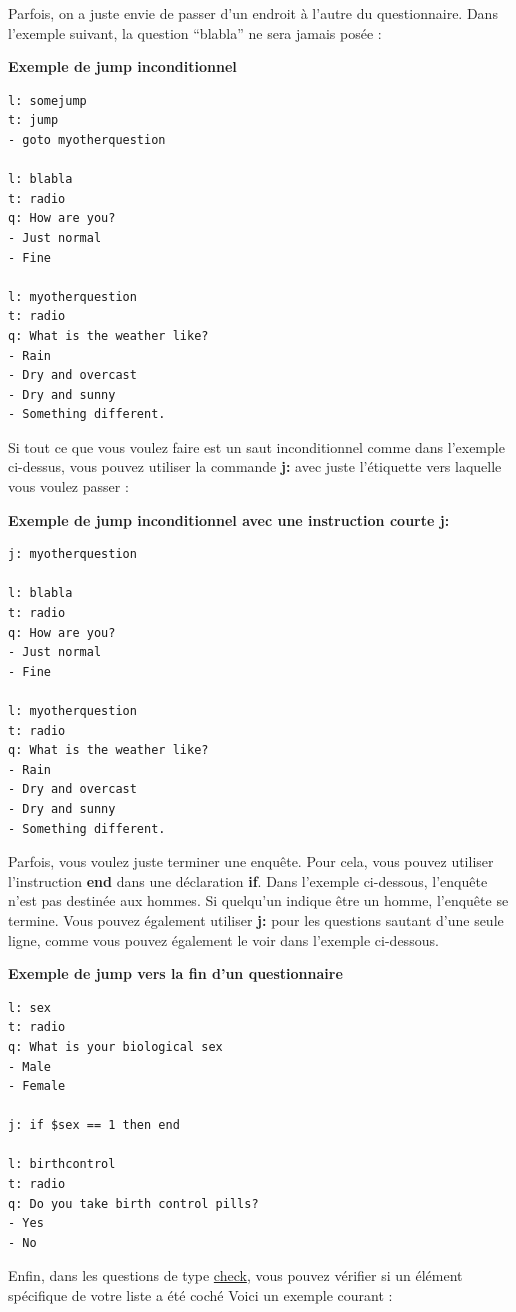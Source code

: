 \documentclass[
]{book}
\begin{document}
Parfois, on a juste envie de passer d'un endroit à l'autre du
questionnaire. Dans l'exemple suivant, la question ``blabla'' ne sera
jamais posée :

\textbf{Exemple de jump inconditionnel}

\begin{verbatim}
l: somejump
t: jump
- goto myotherquestion

l: blabla
t: radio
q: How are you?
- Just normal
- Fine

l: myotherquestion
t: radio
q: What is the weather like?
- Rain
- Dry and overcast
- Dry and sunny
- Something different.
\end{verbatim}

Si tout ce que vous voulez faire est un saut inconditionnel comme dans
l'exemple ci-dessus, vous pouvez utiliser la commande \textbf{j:} avec
juste l'étiquette vers laquelle vous voulez passer :

\textbf{Exemple de jump inconditionnel avec une instruction courte j:}

\begin{verbatim}
j: myotherquestion

l: blabla
t: radio
q: How are you?
- Just normal
- Fine

l: myotherquestion
t: radio
q: What is the weather like?
- Rain
- Dry and overcast
- Dry and sunny
- Something different.
\end{verbatim}

Parfois, vous voulez juste terminer une enquête. Pour cela, vous pouvez
utiliser l'instruction \textbf{end} dans une déclaration \textbf{if}.
Dans l'exemple ci-dessous, l'enquête n'est pas destinée aux hommes. Si
quelqu'un indique être un homme, l'enquête se termine. Vous pouvez
également utiliser \textbf{j:} pour les questions sautant d'une seule
ligne, comme vous pouvez également le voir dans l'exemple ci-dessous.

\textbf{Exemple de jump vers la fin d'un questionnaire}

\begin{verbatim}
l: sex
t: radio
q: What is your biological sex
- Male
- Female

j: if $sex == 1 then end

l: birthcontrol
t: radio
q: Do you take birth control pills?
- Yes
- No
\end{verbatim}

Enfin, dans les questions de type \protect\hyperlink{check}{check}, vous
pouvez vérifier si un élément spécifique de votre liste a été coché
Voici un exemple courant :
\end{document}
